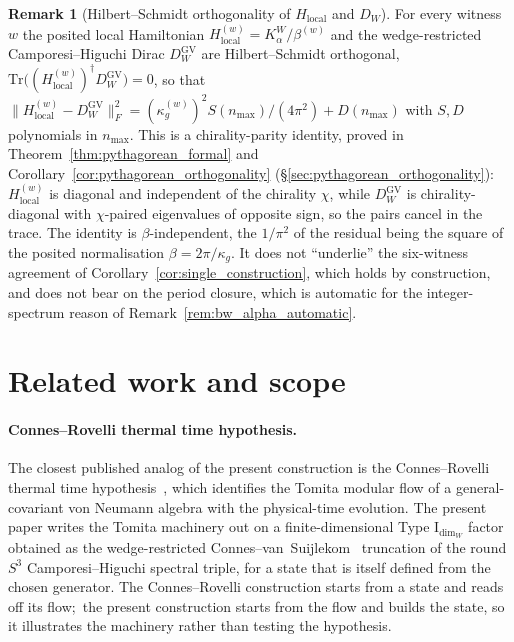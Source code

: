 \documentclass[11pt,a4paper]{article}
\theoremstyle{plain}
\theoremstyle{definition}
\newtheorem{remark}[theorem]{Remark}
\newcommand{\nmax}{n_{\max}}
\newcommand{\sthree}{S^{3}}
\newcommand{\Frob}[1]{\lVert #1 \rVert_{F}}
\newcommand{\Tr}{\mathrm{Tr}}
\begin{document}
\begin{remark}[Hilbert--Schmidt orthogonality of $H_{\mathrm{local}}$ and
$D_W$]\label{rem:pythagorean_underlies_collapse}
For every witness $w$ the posited local Hamiltonian
$H_{\mathrm{local}}^{(w)} = K_\alpha^W/\beta^{(w)}$ and the wedge-restricted
Camporesi--Higuchi Dirac $D_W^{\mathrm{GV}}$ are Hilbert--Schmidt
orthogonal, $\Tr\big((H_{\mathrm{local}}^{(w)})^\dagger D_W^{\mathrm{GV}}\big) = 0$,
so that $\Frob{H_{\mathrm{local}}^{(w)} - D_W^{\mathrm{GV}}}^2 =
(\kappa_g^{(w)})^2 S(\nmax)/(4\pi^2) + D(\nmax)$ with $S, D$ polynomials in
$\nmax$.  This is a chirality-parity identity, proved in
Theorem~\ref{thm:pythagorean_formal} and
Corollary~\ref{cor:pythagorean_orthogonality}
(\S\ref{sec:pythagorean_orthogonality}):\ $H_{\mathrm{local}}^{(w)}$ is
diagonal and independent of the chirality $\chi$, while $D_W^{\mathrm{GV}}$
is chirality-diagonal with $\chi$-paired eigenvalues of opposite sign, so
the pairs cancel in the trace.  The identity is $\beta$-independent, the $1/\pi^2$ of the
residual being the square of the posited normalisation
$\beta = 2\pi/\kappa_g$.  It does not ``underlie'' the six-witness agreement
of Corollary~\ref{cor:single_construction}, which holds by construction,
and does not bear on the period closure, which is automatic for the
integer-spectrum reason of Remark~\ref{rem:bw_alpha_automatic}.
\end{remark}

\section{Related work and scope}\label{sec:related_work}

\paragraph{Connes--Rovelli thermal time hypothesis.}
The closest published analog of the present construction is the
Connes--Rovelli thermal time hypothesis~\cite{connes_rovelli1994},
which identifies the Tomita modular flow of a general-covariant von
Neumann algebra with the physical-time evolution. The present paper
writes the Tomita machinery out on a finite-dimensional Type
I$_{\dim_W}$ factor obtained as the wedge-restricted
Connes--van~Suijlekom~\cite{connes_vs2021} truncation of the round
$\sthree$ Camporesi--Higuchi spectral triple, for a state that is
itself defined from the chosen generator.  The Connes--Rovelli
construction starts from a state and reads off its flow;\ the present
construction starts from the flow and builds the state, so it
illustrates the machinery rather than testing the hypothesis.
\end{document}
